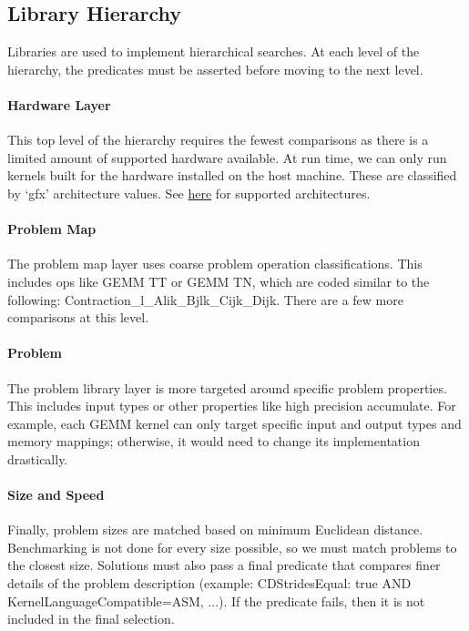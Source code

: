 \documentclass[]{article}
\begin{document}
\subsection{Library Hierarchy}

Libraries are used to implement hierarchical searches. At each level of the hierarchy, the predicates must be asserted before moving to the next level.

\paragraph{Hardware Layer}

This top level of the hierarchy requires the fewest comparisons as there is a limited amount of supported hardware available. At run time, we can only run kernels built for the hardware installed on the host machine. These are classified by `gfx' architecture values. See \href{https://github.com/ROCm/Tensile/wiki/Languages}{here} for supported architectures.

\paragraph{Problem Map}
The problem map layer uses coarse problem operation classifications. This includes ops like GEMM TT or GEMM TN, which are coded similar to the following: Contraction\_l\_Alik\_Bjlk\_Cijk\_Dijk. There are a few more comparisons at this level.

\paragraph{Problem}

The problem library layer is more targeted around specific problem properties. This includes input types or other properties like high precision accumulate. For example, each GEMM kernel can only target specific input and output types and memory mappings; otherwise, it would need to change its implementation drastically.

\paragraph{Size and Speed}

Finally, problem sizes are matched based on minimum Euclidean distance. Benchmarking is not done for every size possible, so we must match problems to the closest size. Solutions must also pass a final predicate that compares finer details of the problem description (example: CDStridesEqual: true AND KernelLanguageCompatible=ASM, ...). If the predicate fails, then it is not included in the final selection.
\end{document}
